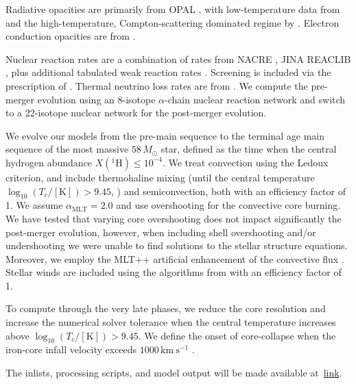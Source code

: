\documentclass[twocolumn,twocolappendix,trackchanges]{aastex63}
\begin{document}
Radiative opacities are primarily from OPAL \citep{Iglesias1993,
  Iglesias1996}, with low-temperature data from \citet{Ferguson2005}
and the high-temperature, Compton-scattering dominated regime by
\citet{Buchler1976}. Electron conduction opacities are from
\citet{Cassisi2007}.

Nuclear reaction rates are a combination of rates from NACRE
\citep{Angulo1999}, JINA REACLIB \citep{Cyburt2010}, plus additional
tabulated weak reaction rates \citet{Fuller1985, Oda1994,
  Langanke2000}. Screening is included via the prescription of
\citet{Chugunov2007}.  Thermal neutrino loss rates are from
\citet{Itoh1996}. We compute the pre-merger evolution using an
8-isotope $\alpha$-chain nuclear reaction network and switch to a
22-isotope nuclear network for the post-merger evolution.

We evolve our models from the pre-main sequence to the terminal age
main sequence of the most massive $58\,M_\odot$ star, defined as the
time when the central hydrogen abundance $X(^1\mathrm{H})\leq 10^{-4}$.
We treat convection using the Ledoux criterion, and include
thermohaline mixing (until the central temperature
$\log_{10}(T_c/\mathrm{[K]})>9.45$, \citealt{farmer:16}) and semiconvection, both with an
efficiency factor of 1. We assume $\alpha_\mathrm{MLT}=2.0$ and use
\cite{brott:11} overshooting for the convective core burning. We have
tested that varying core overshooting does not impact significantly the
post-merger evolution, however, when including shell overshooting
and/or undershooting we were unable to find solutions to the stellar
structure equations. Moreover, we employ the MLT++ artificial
enhancement of the convective flux \citep[e.g.,][]{paxton:15,
  jiang:15}. Stellar winds are included using the algorithms from
\cite{vink:01} with an efficiency factor of 1.%

To compute through the very late phases, we reduce the core resolution
and increase the numerical solver tolerance when the central
temperature increases above $\log_{10}(T_c/\mathrm{[K]})>9.45$. We
define the onset of core-collapse when the iron-core infall velocity
exceeds $1000\,\mathrm{km\ s^{-1}}$ \citep[e.g.,][]{woosley:02}.

The inlists, processing scripts, and model output will be made available at~\href{link}{link}.



\end{document}
